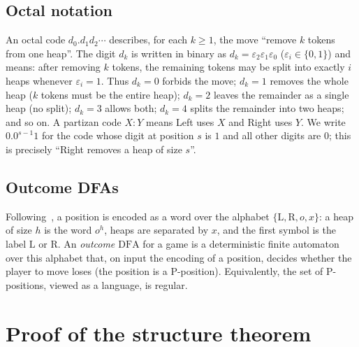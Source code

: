 \documentclass[11pt]{article}
\newcommand{\outL}{\ensuremath{\mathrm{L}}}
\newcommand{\outR}{\ensuremath{\mathrm{R}}}
\newcommand{\outP}{\ensuremath{\mathrm{P}}}
\newcommand{\DFA}{\ensuremath{\mathrm{DFA}}}
\begin{document}
\subsection{Octal notation}

An octal code $d_0.d_1d_2\cdots$ describes, for each $k\ge1$, the move ``remove $k$ tokens
from one heap''. The digit $d_k$ is written in binary as $d_k=\varepsilon_2\varepsilon_1
\varepsilon_0$ ($\varepsilon_i\in\{0,1\}$) and means: after removing $k$ tokens, the remaining
tokens may be split into exactly $i$ heaps whenever $\varepsilon_i=1$. Thus $d_k=0$ forbids
the move; $d_k=1$ removes the whole heap ($k$ tokens must be the entire heap); $d_k=2$ leaves
the remainder as a single heap (no split); $d_k=3$ allows both; $d_k=4$ splits the remainder
into two heaps; and so on. A partizan code $X:Y$ means Left uses $X$ and Right uses $Y$. We
write $0.0^{s-1}1$ for the code whose digit at position $s$ is $1$ and all other digits are
$0$; this is precisely ``Right removes a heap of size $s$''.

\subsection{Outcome DFAs}\label{sec:dfa}

Following~\cite{LiangFA}, a position is encoded as a word over the alphabet
$\{\outL,\outR,o,x\}$: a heap of size $h$ is the word $o^h$, heaps are separated by $x$, and
the first symbol is the label $\outL$ or $\outR$. An \emph{outcome \DFA} for a game is a
deterministic finite automaton over this alphabet that, on input the encoding of a position,
decides whether the player to move loses (the position is a $\outP$-position). Equivalently,
the set of $\outP$-positions, viewed as a language, is regular.

\section{Proof of the structure theorem}
\end{document}
